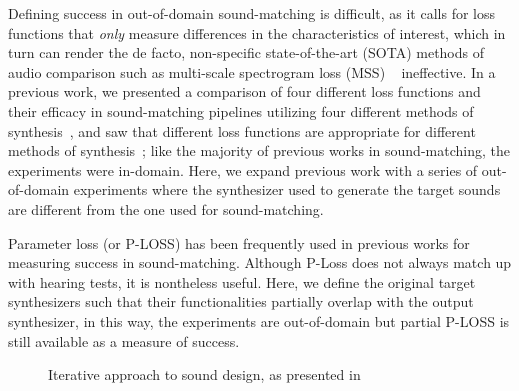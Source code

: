 \documentclass[runningheads]{llncs}
\begin{document}
Defining success in out-of-domain sound-matching is difficult, as it calls for loss functions that \textit{only} measure differences in the characteristics of interest, which in turn can render the de facto, non-specific state-of-the-art (SOTA) methods of audio comparison such as multi-scale spectrogram loss (MSS) ~\cite{engel2020ddsp} ineffective. In a previous work, we presented a comparison of four different loss functions and their efficacy in sound-matching pipelines utilizing four different methods of synthesis~\cite{salimi2025soundmatching}, and saw that different loss functions are appropriate for different methods of synthesis~\cite{salimi2025soundmatching}; like the majority of previous works in sound-matching, the experiments were in-domain. Here, we expand previous work with a series of out-of-domain experiments where the synthesizer used to generate the target sounds are different from the one used for sound-matching. 

Parameter loss (or P-LOSS) has been frequently used in previous works for measuring success in sound-matching. Although P-Loss does not always match up with hearing tests, it is nontheless useful. Here, we define the original target synthesizers such that their functionalities partially overlap with the output synthesizer, in this way, the experiments are out-of-domain but partial P-LOSS is still available as a measure of success. 



\begin{figure}[ht]
    \centering
{}
    \caption{ Iterative approach to sound design, as presented in~\cite{salimi2025soundmatching}}
    \label{fig:sound_design_loop_iterative}
\end{figure}
\end{document}
